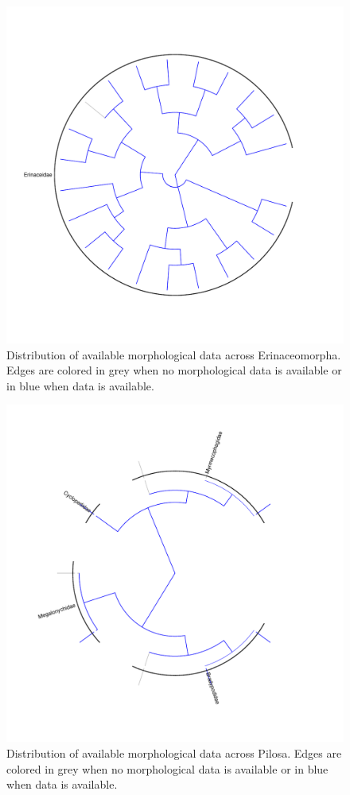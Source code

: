 \documentclass[12pt,letterpaper]{article}
\begin{document}
\begin{figure}[!htbp]
\centering
    \includegraphics[width=1\textwidth]{Supp_figure_ERINACEOMORPHA.pdf}
\caption{Distribution of available morphological data across Erinaceomorpha. Edges are colored in grey when no morphological data is available or in blue when data is available.}
\label{Supp_Figure_Phylo-Erinaceomorpha}
\end{figure}

\begin{figure}[!htbp]
\centering
    \includegraphics[width=1\textwidth]{Supp_figure_PILOSA.pdf}
\caption{Distribution of available morphological data across Pilosa. Edges are colored in grey when no morphological data is available or in blue when data is available.}
\label{Supp_Figure_Phylo-Pilosa}
\end{figure}
\end{document}
